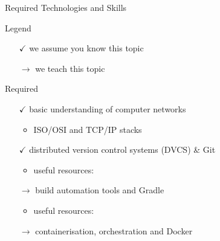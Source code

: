 \documentclass[presentation]{beamer}\mode<presentation>{\usetheme{AMSBolognaFC}}
\begin{document}
\begin{frame}[c,allowframebreaks]{Required Technologies and Skills}

    \begin{block}{Legend}
        \begin{multicols}{2}
            \begin{itemize}
                \item[$\checkmark$] we assume you know this topic
                \item[$\rightarrow$] we teach this topic
            \end{itemize}
        \end{multicols}
    \end{block}

    \framebreak

    \begin{alertblock}{Required}
        \begin{itemize}
            \item[$\checkmark$] basic understanding of computer networks
            \begin{itemize}
                \item ISO/OSI and TCP/IP stacks
            \end{itemize}

            \item[$\checkmark$] distributed version control systems (DVCS) \& \alert{Git}
            \begin{itemize}
                \item useful resources: \cite{pianiniDvcs, proGit}
            \end{itemize}

            \vfill

            \item[$\rightarrow$] build automation tools and \alert{Gradle}
            \begin{itemize}
                \item useful resources: \cite{pianiniBuildAutomation, gradleUserGuide}
            \end{itemize}

            \vfill

            \item[$\rightarrow$] containerisation, orchestration and \alert{Docker}

            \vfill


\end{itemize}
\end{alertblock}
\end{frame}
\end{document}
